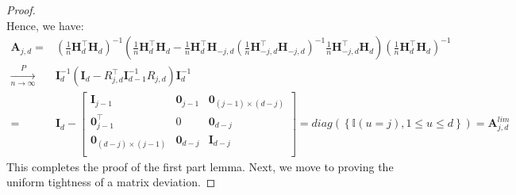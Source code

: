 \documentclass[10pt,a4paper]{amsart}
\newcommand{\bA}{\boldsymbol{A}}
\newcommand{\bH}{\boldsymbol{H}}
\newcommand{\bI}{\boldsymbol{I}}
\newcommand{\bzero}{\boldsymbol{0}}
\newcommand{\pnlim}{\xrightarrow[n \to \infty]{P}}
\begin{document}
\begin{proof}
\begin{equation}
\end{equation}
Hence, we have:
$$
\begin{aligned}
    \bA_{j,d} = & \left(\frac{1}{n}\bH_{d}^\top\bH_{d}\right)^{-1}\left(\frac{1}{n}\bH_{d}^\top\bH_{d} - \frac{1}{n}\bH_{d}^\top\bH_{-j,d}\left(\frac{1}{n}\bH_{-j,d}^\top\bH_{-j,d}\right)^{-1}\frac{1}{n}\bH_{-j,d}^\top\bH_{d}\right)\left(\frac{1}{n}\bH_{d}^\top\bH_{d}\right)^{-1}\\
    \pnlim & \bI^{-1}_d\left(\bI_d - R^\top_{j,d}\bI_{d-1}^{-1}R_{j,d}\right)\bI^{-1}_d\\
    = & \bI_d - \begin{bmatrix}
    \bI_{j-1} & \bzero_{j-1} & \bzero_{(j-1) \times (d-j)}\\
    \bzero^\top_{j-1} & 0 & \bzero_{d-j}\\
    \bzero_{(d-j) \times (j-1)} & \bzero_{d-j} & \bI_{d-j} \\
\end{bmatrix} = diag(\left\{\mathbb{I}(u = j), 1 \leq u \leq d\right\}) = \bA^{lim}_{j,d}
\end{aligned}
$$
This completes the proof of the first part lemma. Next, we move to proving the uniform tightness of a matrix deviation. 


\end{proof}
\end{document}
